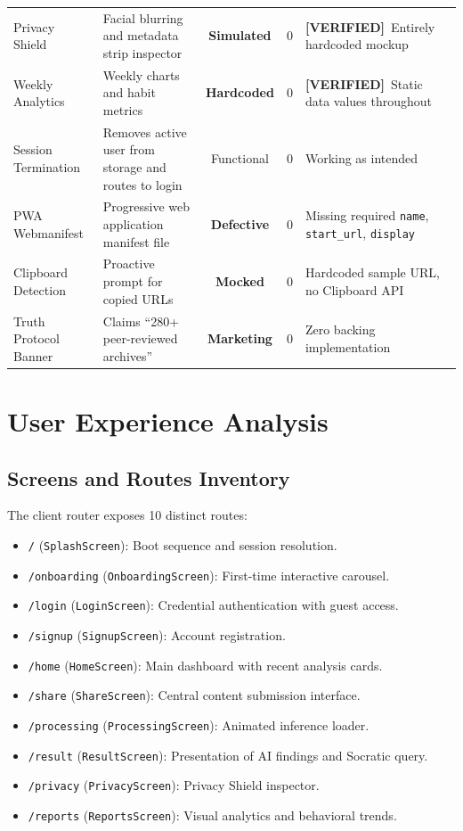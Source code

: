 \documentclass[10pt,a4paper]{report}
\newcommand{\verified}{\colorbox{green!15}{\textcolor{passGreen}{\bfseries\scriptsize [VERIFIED]}}}
\begin{document}
\begin{table}[htbp]
\begin{tabularx}{\textwidth}{l X c c p{3.2cm}}
Privacy Shield & Facial blurring and metadata strip inspector & \textbf{Simulated} & 0 & \verified\ Entirely hardcoded mockup \\
Weekly Analytics & Weekly charts and habit metrics & \textbf{Hardcoded} & 0 & \verified\ Static data values throughout \\
Session Termination & Removes active user from storage and routes to login & Functional & 0 & Working as intended \\
PWA Webmanifest & Progressive web application manifest file & \textbf{Defective} & 0 & Missing required \texttt{name}, \texttt{start\_url}, \texttt{display} \\
Clipboard Detection & Proactive prompt for copied URLs & \textbf{Mocked} & 0 & Hardcoded sample URL, no Clipboard API \\
Truth Protocol Banner & Claims ``280+ peer-reviewed archives'' & \textbf{Marketing} & 0 & Zero backing implementation \\
\bottomrule
\end{tabularx}
\end{table}

\chapter{User Experience Analysis}

\section{Screens and Routes Inventory}
The client router exposes 10 distinct routes:
\begin{itemize}[leftmargin=1.5em]
    \item \texttt{/} (\texttt{SplashScreen}): Boot sequence and session resolution.
    \item \texttt{/onboarding} (\texttt{OnboardingScreen}): First-time interactive carousel.
    \item \texttt{/login} (\texttt{LoginScreen}): Credential authentication with guest access.
    \item \texttt{/signup} (\texttt{SignupScreen}): Account registration.
    \item \texttt{/home} (\texttt{HomeScreen}): Main dashboard with recent analysis cards.
    \item \texttt{/share} (\texttt{ShareScreen}): Central content submission interface.
    \item \texttt{/processing} (\texttt{ProcessingScreen}): Animated inference loader.
    \item \texttt{/result} (\texttt{ResultScreen}): Presentation of AI findings and Socratic query.
    \item \texttt{/privacy} (\texttt{PrivacyScreen}): Privacy Shield inspector.
    \item \texttt{/reports} (\texttt{ReportsScreen}): Visual analytics and behavioral trends.
\end{itemize}
\end{document}
